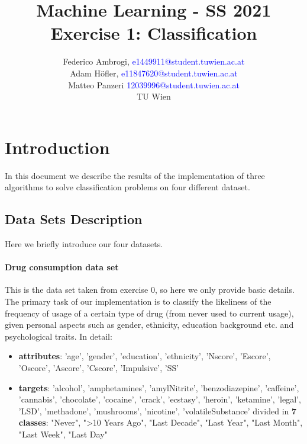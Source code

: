 \documentclass{article}
\begin{document}
\title{ Machine Learning - SS 2021 \\ Exercise 1: Classification }


	\author{Federico Ambrogi, \textcolor{blue} {e1449911@student.tuwien.ac.at } \\
	Adam Höfler, \textcolor{blue} {e11847620@student.tuwien.ac.at } \\
	Matteo Panzeri \textcolor{blue}{12039996@student.tuwien.ac.at } \\
    TU Wien }






\maketitle
\setcounter{tocdepth}{2}
\tableofcontents

\section{Introduction}
In this document we describe the results of the implementation of three algorithms to solve classification problems on four different dataset.




\subsection{Data Sets Description}
Here we briefly introduce our four datasets.

\paragraph{Drug consumption data set} This is the data set taken from exercise 0, so here we only provide basic details. The primary task of our implementation is to classify the likeliness of the frequency of usage of a certain type of drug (from never used to current usage), given personal aspects such as gender, ethnicity, education background etc. and psychological traits.
In detail:
\begin{itemize}
	\item  \textbf{attributes}: 'age', 'gender', 'education', 'ethnicity', 'Nscore', 'Escore', 'Oscore', 'Ascore', 'Cscore', 'Impulsive', 'SS' \\
	\item  \textbf{targets}: 'alcohol', 'amphetamines', 'amylNitrite', 'benzodiazepine', 'caffeine', 'cannabis', 'chocolate', 'cocaine', 'crack', 'ecstasy', 'heroin', 'ketamine', 'legal', 'LSD',
	'methadone', 'mushrooms', 'nicotine', 'volatileSubstance'
	divided in \textbf{7 classes}: "Never", ">10 Years Ago", "Last Decade", "Last Year", "Last Month", "Last Week", "Last Day"
\end{itemize}
\end{document}
